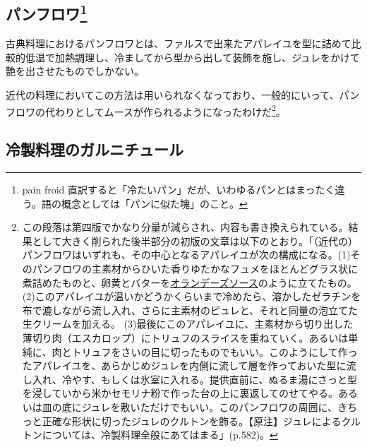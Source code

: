 \begin{Main}
\hypertarget{pains-froids}{%
\subsection[パンフロワ]{\texorpdfstring{パンフロワ\footnote{pain froid
  直訳すると「冷たいパン」だが、いわゆるパンとはまったく違う。語の概念としては「パンに似た塊」のこと。}}{パンフロワ}}\label{pains-froids}}



古典料理におけるパンフロワとは、ファルスで出来たアパレイユを型に詰めて比較的低温で加熱調理し、冷ましてから型から出して装飾を施し、ジュレをかけて艶を出させたものでしかない。

近代の料理においてこの方法は用いられなくなっており、一般的にいって、パンフロワの代わりとしてムースが作られるようになったわけだ\footnote{この段落は第四版でかなり分量が減らされ、内容も書き換えられている。結果として大きく削られた後半部分の初版の文章は以下のとおり。「（近代の）パンフロワはいずれも、その中心となるアパレイユが次の構成になる。(1)そのパンフロワの主素材からひいた香りゆたかなフュメをほとんどグラス状に煮詰めたものと、卵黄とバターを\protect\hyperlink{sauce-hollandaise}{オランデーズソース}のように立てたもの。(2)このアパレイユが温いかどうかくらいまで冷めたら、溶かしたゼラチンを布で漉しながら流し入れ、さらに主素材のピュレと、それと同量の泡立てた生クリームを加える。
  (3)最後にこのアパレイユに、主素材から切り出した薄切り肉（エスカロップ）にトリュフのスライスを重ねていく。あるいは単純に、肉とトリュフをさいの目に切ったものでもいい。このようにして作ったアパレイユを、あらかじめジュレを内側に流して層を作っておいた型に流し入れ、冷やす、もしくは氷室に入れる。提供直前に、ぬるま湯にさっと型を浸していから米かセモリナ粉で作った台の上に裏返してのせてやる。あるいは皿の底にジュレを敷いただけでもいい。このパンフロワの周囲に、きちっと正確な形状に切ったジュレのクルトンを飾る。【原注】ジュレによるクルトンについては、冷製料理全般にあてはまる」(p.582)。}。

\hypertarget{garnitures-de-mets-froids}{%
\subsection{冷製料理のガルニチュール}\label{garnitures-de-mets-froids}}




\end{Main}
